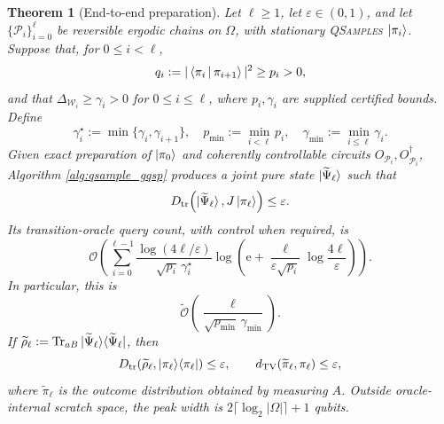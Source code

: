 \documentclass[10pt,conference]{IEEEtran}
\theoremstyle{plain}
\newtheorem{theorem}{Theorem}[section]
\theoremstyle{remark}
\renewcommand{\braket}[2]{\Braket{#1 | #2}}
\newcommand{\TV}{d_{\mathrm{TV}}}
\begin{document}
\begin{theorem}[End-to-end preparation]
\label{thm:end-to-end}
Let \(\ell\geq1\), let \(\varepsilon\in(0,1)\), and let
\(\{\mathcal P_i\}_{i=0}^{\ell}\) be reversible ergodic chains on
\(\Omega\), with stationary \textup{\textsc{QSamples}}
\(\ket{\pi_i}\).
Suppose that, for \(0\leq i<\ell\),
\begin{equation}
q_i:=|\braket{\pi_i}{\pi_{i+1}}|^2\geq p_i>0,
\end{equation}
and that \(\Delta_{\mathcal W_i}\geq\gamma_i>0\) for
\(0\leq i\leq\ell\), where \(p_i,\gamma_i\) are supplied certified
bounds.  Define
\[
\gamma_i^\star:=\min\{\gamma_i,\gamma_{i+1}\},\quad
p_{\min}:=\min_{i<\ell}p_i,\quad
\gamma_{\min}:=\min_{i\leq\ell}\gamma_i .
\]
Given exact preparation of \(\ket{\pi_0}\) and coherently
controllable circuits \(O_{\mathcal P_i},O_{\mathcal P_i}^\dagger\), Algorithm
\ref{alg:qsample_gqsp} produces a joint pure state
\(\ket{\widetilde\Psi_\ell}\) such that
\begin{equation}
D_{\rm tr}\!\left(
\ket{\widetilde\Psi_\ell},J\ket{\pi_\ell}\right)\leq\varepsilon .
\label{eq:joint-output-guarantee}
\end{equation}
Its transition-oracle query count, with control when required, is
\begin{equation}
\label{eq:query_complexity_main_sum}
\mathcal O\!\left(
\sum_{i=0}^{\ell-1}
\frac{\log(4\ell/\varepsilon)}
{\sqrt{p_i}\,\gamma_i^\star}
\log\!\left(
\mathrm e+
\frac{\ell}{\varepsilon\sqrt{p_i}}
\log\frac{4\ell}{\varepsilon}
\right)\right).
\end{equation}
In particular, this is
\[
\widetilde{\mathcal O}\!\left(
\frac{\ell}{\sqrt{p_{\min}}\,\gamma_{\min}}\right).
\]
If
\(\widetilde\rho_\ell:=
\operatorname{Tr}_{aB}
\ket{\widetilde\Psi_\ell}\!\bra{\widetilde\Psi_\ell}\),
then
\[
D_{\rm tr}(\widetilde\rho_\ell,
\ket{\pi_\ell}\!\bra{\pi_\ell})\leq\varepsilon ,
\qquad
\TV(\widetilde\pi_\ell,\pi_\ell)\leq\varepsilon ,
\]
where \(\widetilde\pi_\ell\) is the outcome distribution obtained by
measuring \(A\).  Outside oracle-internal scratch space, the peak
width is \(2\lceil\log_2|\Omega|\rceil+1\) qubits.
\end{theorem}
\end{document}
